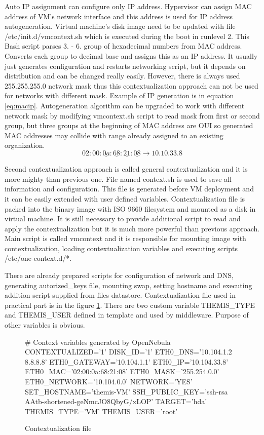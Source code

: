 Auto \Ac{IP} assignment can configure only \Ac{IP} address. Hypervisor can assign \Ac{MAC} address of \Ac{VM}'s network interface and this address is used for \Ac{IP} address autogeneration. Virtual machine's disk image need to be updated with file /etc/init.d/vmcontext.sh which is executed during the boot in runlevel 2. This \Ac{Bash} script parses 3. - 6. group of hexadecimal numbers from \Ac{MAC} address. Converts each group to decimal base and assigns this as an \Ac{IP} address. It usually just generates configuration and restarts networking script, but it depends on distribution and can be changed really easily.
However, there is always used 255.255.255.0 network mask thus this contextualization approach can not be used for networks with different mask. Example of \Ac{IP} generation is in equation \ref{eq:macip}. Autogeneration algorithm can be upgraded to work with different network mask by modifying vmcontext.sh script to read mask from first or second group, but three groups at the beginning of \Ac{MAC} address are \Ac{OUI} so generated \Ac{MAC} addresses may collide with range already assigned to an existing organization.
\begin{equation}
	\label{eq:macip}
	02:00:\underline{0a}:\underline{68}:\underline{21}:\underline{08} \rightarrow 10.10.33.8
\end{equation}

Second contextualization approach is called general contextualization and it is more mighty than previous one. File named context.sh is used to save all information and configuration. This file is generated before \Ac{VM} deployment and it can be easily extended with user defined variables.
Contextualization file is packed into the binary image with ISO 9660 filesystem and mounted as a disk in virtual machine.
It is still necessary to provide additional script to read and apply the contextualization but it is much more powerful than previous approach. Main script is called vmcontext and it is responsible for mounting image with contextualization, loading contextualization variables and executing scripts /etc/one-context.d/*. 

There are already prepared scripts for configuration of network and \Ac{DNS}, generating autorized\_keys file, mounting swap, setting hostname and executing addition script supplied from files datastore. Contextualization file used in practical part is in the figure \ref{code:contextualization}. There are two custom variable THEMIS\_TYPE and THEMIS\_USER defined in template and used by middleware. Purpose of other variables is obvious.

\begin{figure}[htb]
\caption{Contextualization file}
\label{code:contextualization}
\begin{verbatimtab}
# Context variables generated by OpenNebula
CONTEXTUALIZED='1'
DISK_ID='1'
ETH0_DNS='10.104.1.2 8.8.8.8'
ETH0_GATEWAY='10.104.1.1'
ETH0_IP='10.104.33.8'
ETH0_MAC='02:00:0a:68:21:08'
ETH0_MASK='255.254.0.0'
ETH0_NETWORK='10.104.0.0'
NETWORK='YES'
SET_HOSTNAME='themis-VM'
SSH_PUBLIC_KEY='ssh-rsa AAtb-shortened-geNmcJO8QbyG/xLOP'
TARGET='hda'
THEMIS_TYPE='VM'
THEMIS_USER='root'
\end{verbatimtab}
\end{figure}

